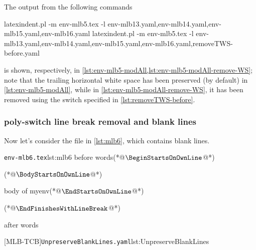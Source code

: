	The output from the following commands \begin{widepage} \begin{commandshell}
latexindent.pl -m env-mlb5.tex -l env-mlb13.yaml,env-mlb14.yaml,env-mlb15.yaml,env-mlb16.yaml
latexindent.pl -m env-mlb5.tex -l env-mlb13.yaml,env-mlb14.yaml,env-mlb15.yaml,env-mlb16.yaml,removeTWS-before.yaml
\end{commandshell} \end{widepage} is shown, respectively, in \cref{lst:env-mlb5-modAll,lst:env-mlb5-modAll-remove-WS}; note that the trailing horizontal white space has been preserved (by default) in \cref{lst:env-mlb5-modAll}, while in \cref{lst:env-mlb5-modAll-remove-WS}, it has been removed using the switch specified in \cref{lst:removeTWS-before}.

	\begin{widepage}

	\end{widepage}

\subsubsection{poly-switch line break removal and blank lines}
	Now let's consider the file in \cref{lst:mlb6}, which contains blank lines.

	\begin{minipage}{.45\linewidth}
		\begin{cmhlistings}[escapeinside={(*@}{@*)}]{\texttt{env-mlb6.tex}}{lst:mlb6}
before words(*@$\BeginStartsOnOwnLine$@*)


\begin{myenv}(*@$\BodyStartsOnOwnLine$@*)


body of myenv(*@$\EndStartsOnOwnLine$@*)


\end{myenv}(*@$\EndFinishesWithLineBreak$@*)

after words
\end{cmhlistings}
	\end{minipage}%
	\hfill
	\begin{minipage}{.45\linewidth}
		[MLB-TCB]{\texttt{UnpreserveBlankLines.yaml}}{lst:UnpreserveBlankLines}
	\end{minipage}

